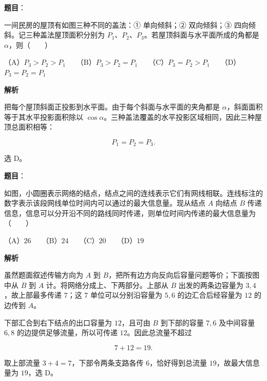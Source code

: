 \begin{answer}

\textbf{题目}：

一间民房的屋顶有如图三种不同的盖法：① 单向倾斜；② 双向倾斜；③ 四向倾斜。记三种盖法屋顶面积分别为 $P_1$、$P_2$、$P_3$。若屋顶斜面与水平面所成的角都是 $\alpha$，则\mbox{（　　）}
\nopagebreak[4]
\begin{center}\end{center}
\nopagebreak[4]
（A）$P_3>P_2>P_1$　　（B）$P_3>P_2=P_1$　　（C）$P_3=P_2>P_1$　　（D）$P_3=P_2=P_1$

\textbf{解析}

把每个屋顶斜面正投影到水平面。由于每个斜面与水平面的夹角都是 $\alpha$，斜面面积等于其水平投影面积除以 $\cos\alpha$。三种盖法覆盖的水平投影区域相同，因此三种屋顶总面积相等：

\nopagebreak[4]
\[
P_1=P_2=P_3.
\]

选 D。


\end{answer}
\begin{answer}

\textbf{题目}：

如图，小圆圈表示网络的结点，结点之间的连线表示它们有网线相联。连线标注的数字表示该段网线单位时间内可以通过的最大信息量。现从结点 $A$ 向结点 $B$ 传递信息，信息可以分开沿不同的路线同时传递，则单位时间内传递的最大信息量为\mbox{（　　）}
\nopagebreak[4]
\begin{center}\end{center}
\nopagebreak[4]
（A）$26$　　（B）$24$　　（C）$20$　　（D）$19$

\textbf{解析}

虽然题面叙述传输方向为 $A$ 到 $B$，把所有边方向反向后容量问题等价；下面按图中从 $B$ 到 $A$ 计。将网络分成上、下两部分。上部从 $B$ 出发的两条边容量为 $3,4$，故上部最多传递 $7$；这 $7$ 单位可以分别沿容量为 $5,6$ 的边汇合后经容量为 $12$ 的边传到 $A$。

下部汇合到右下结点的出口容量为 $12$，且可由 $B$ 到下部的容量 $7,6$ 及中间容量 $6,8$ 的边提供足够流量，所以可传递 $12$。因此总流量不超过

\nopagebreak[4]
\[
7+12=19.
\]

取上部流量 $3+4=7$，下部令两条支路各传 $6$，恰好得到总流量 $19$，故最大信息量为 $19$，选 D。


\end{answer}

